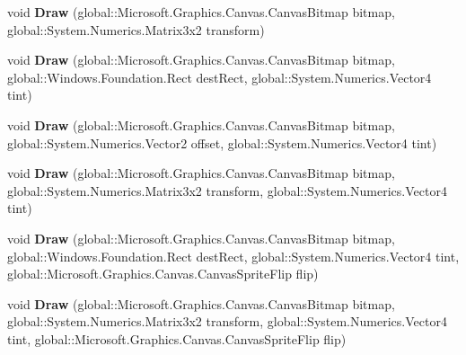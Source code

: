 \begin{DoxyCompactItemize}
void {\bfseries Draw} (global\+::\+Microsoft.\+Graphics.\+Canvas.\+Canvas\+Bitmap bitmap, global\+::\+System.\+Numerics.\+Matrix3x2 transform)
\item 
\mbox{\label{interface_microsoft_1_1_graphics_1_1_canvas_1_1_i_canvas_sprite_batch_a858a891f85b1b06333536091c54eefac}} 
void {\bfseries Draw} (global\+::\+Microsoft.\+Graphics.\+Canvas.\+Canvas\+Bitmap bitmap, global\+::\+Windows.\+Foundation.\+Rect dest\+Rect, global\+::\+System.\+Numerics.\+Vector4 tint)
\item 
\mbox{\label{interface_microsoft_1_1_graphics_1_1_canvas_1_1_i_canvas_sprite_batch_a74de3e1e7c2648ca4c114b88d8751e12}} 
void {\bfseries Draw} (global\+::\+Microsoft.\+Graphics.\+Canvas.\+Canvas\+Bitmap bitmap, global\+::\+System.\+Numerics.\+Vector2 offset, global\+::\+System.\+Numerics.\+Vector4 tint)
\item 
\mbox{\label{interface_microsoft_1_1_graphics_1_1_canvas_1_1_i_canvas_sprite_batch_a43b4642b34dc5a505f5641f8ff427b90}} 
void {\bfseries Draw} (global\+::\+Microsoft.\+Graphics.\+Canvas.\+Canvas\+Bitmap bitmap, global\+::\+System.\+Numerics.\+Matrix3x2 transform, global\+::\+System.\+Numerics.\+Vector4 tint)
\item 
\mbox{\label{interface_microsoft_1_1_graphics_1_1_canvas_1_1_i_canvas_sprite_batch_ab1352e40c4e4dc5470141c64e30a1bbf}} 
void {\bfseries Draw} (global\+::\+Microsoft.\+Graphics.\+Canvas.\+Canvas\+Bitmap bitmap, global\+::\+Windows.\+Foundation.\+Rect dest\+Rect, global\+::\+System.\+Numerics.\+Vector4 tint, global\+::\+Microsoft.\+Graphics.\+Canvas.\+Canvas\+Sprite\+Flip flip)
\item 
\mbox{\label{interface_microsoft_1_1_graphics_1_1_canvas_1_1_i_canvas_sprite_batch_a3dbc3671a300529cccb128a7e731641a}} 
void {\bfseries Draw} (global\+::\+Microsoft.\+Graphics.\+Canvas.\+Canvas\+Bitmap bitmap, global\+::\+System.\+Numerics.\+Matrix3x2 transform, global\+::\+System.\+Numerics.\+Vector4 tint, global\+::\+Microsoft.\+Graphics.\+Canvas.\+Canvas\+Sprite\+Flip flip)

\end{DoxyCompactItemize}
